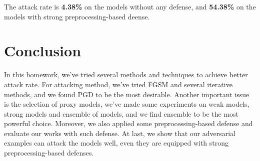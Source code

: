 \documentclass{article}
\begin{document}
The attack rate is \textbf{4.38\%} on the models without any defense, and \textbf{54.38\%} on the models with strong preprocessing-based deense.

\section{Conclusion}
In this homework, we've tried several methods and techniques to achieve better attack rate. For attacking method, we've tried FGSM and several iterative methods, and we found PGD to be the most desirable. Another important issue is the selection of proxy models, we've made some experiments on weak models, strong models and ensemble of models, and we find ensemble to be the most powerful choice. Moreover, we also applied some preprocessing-based defense and evaluate our works with such defense. At last, we show that our adversarial examples can attack the models well, even they are equipped with strong preprocessing-based defenses.



\end{document}
